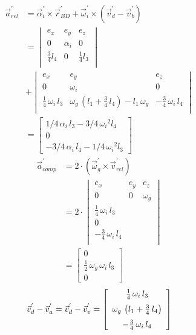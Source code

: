 \begin{equation}
\begin{split}
\vec{a}_{rel}^{'}&=\vec{\alpha}_{i}^{'}\times\vec{r}_{BD}^{'}+\vec{\omega}_{i}^{'}\times(\vec{v}_{d}^{'}-\vec{v}_{b}^{'})\\
&=\begin{vmatrix}
e_{x}&e_{y}&e_{z}\\
0&\alpha_{i}&0\\
\frac{3}{4}l_{4}&0&\frac{1}{4}l_{3}\\
\end{vmatrix}\\
&+\begin{vmatrix}
e_{x}&e_{y}&e_{z}\\
0&\omega_{i}&0\\
\frac{1}{4}\,\omega_{i}\,l_{3}&\omega_{g}\, \left( l_{1}+\frac{3}{4}\,l_{4} \right)-l_{1}\,\omega_{g}&-\frac{3}{4}\,\omega_{i}\,l_{4}\\
\end{vmatrix}\\
&=\left[ \begin {array}{c} 1/4\,\alpha_{i}\,l_{3}-3/4\,{\omega_{i}}^{2}l_{4}\\0\\-3/4\,\alpha_{i}\,l_{4}-1/4\,{\omega_{i}}^{2}l_{3}\end {array} \right]
\end{split}
\label{eq:kin4.8}
\end{equation}
\begin{equation}
\begin{split}
\vec{a}_{comp}^{'}&=2\cdot(\vec{\omega}_{g}^{'}\times\vec{v}_{rel}^{'})\\
&=2\cdot
\begin{vmatrix}
e_{x}&e_{y}&e_{z}\\
0&0&\omega_{g}\\
\frac{1}{4}\,\omega_{i}\,l_{3}\\0\\-\frac{3}{4}\,\omega_{i}\,l_{4}\\
\end{vmatrix}\\
&=\left[ \begin {array}{c} 0\\ \frac{1}{2}\,\omega_{g}\,
\omega_{i}\,l_{3}\\ 0\end {array} \right]
\end{split}
\label{eq:kin4.9}
\end{equation}
\begin{equation}
\vec{v}_{d}^{'}-\vec{v}_{a}^{'}=\vec{v}_{d}^{'}-\vec{v}_{v}^{'}=
\left[ \begin {array}{c} \frac{1}{4}\,\omega_{i}\,l_{3}\\ \noalign{\medskip}\omega_{g}\, \left( l_{1}+\frac{3}{4}\,l_{4} \right) \\ \noalign{\medskip}-\frac{3}{4}\,\omega_{i}\,l_{4}\end {array} \right]
\label{eq:kin4.10}
\end{equation}
